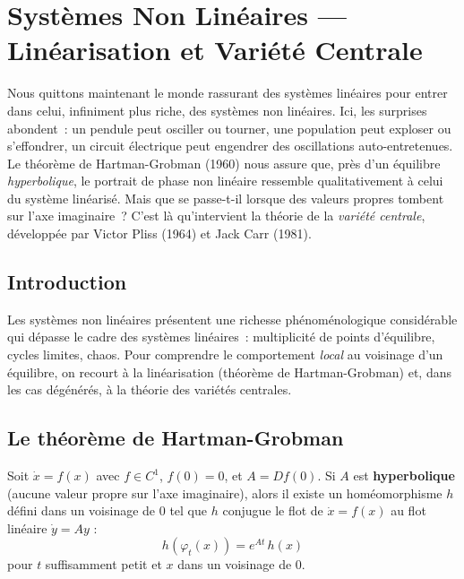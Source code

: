 \chapter{Syst\`emes Non Lin\'eaires --- Lin\'earisation et Vari\'et\'e Centrale}
\label{ch:non_lineaires}

Nous quittons maintenant le monde rassurant des syst\`emes lin\'eaires pour entrer dans celui, infiniment plus riche, des syst\`emes non lin\'eaires. Ici, les surprises abondent~: un pendule peut osciller ou tourner, une population peut exploser ou s'effondrer, un circuit \'electrique peut engendrer des oscillations auto-entretenues. Le th\'eor\`eme de Hartman-Grobman (1960) nous assure que, pr\`es d'un \'equilibre \emph{hyperbolique}, le portrait de phase non lin\'eaire ressemble qualitativement \`a celui du syst\`eme lin\'earis\'e. Mais que se passe-t-il lorsque des valeurs propres tombent sur l'axe imaginaire~? C'est l\`a qu'intervient la th\'eorie de la \emph{vari\'et\'e centrale}, d\'evelopp\'ee par Victor Pliss (1964) et Jack Carr (1981).

\section{Introduction}

Les syst\`emes non lin\'eaires pr\'esentent une richesse ph\'enom\'enologique
consid\'erable qui d\'epasse le cadre des syst\`emes lin\'eaires~:
multiplicit\'e de points d'\'equilibre, cycles limites, chaos. Pour
comprendre le comportement \emph{local} au voisinage d'un \'equilibre, on
recourt \`a la lin\'earisation (th\'eor\`eme de Hartman-Grobman) et, dans les
cas d\'eg\'en\'er\'es, \`a la th\'eorie des vari\'et\'es centrales.

\section{Le th\'eor\`eme de Hartman-Grobman}

\begin{theoreme}
\label{thm:hartman-grobman}
Soit $\dot{x} = f(x)$ avec $f \in C^1$, $f(0) = 0$, et $A = Df(0)$.
Si $A$ est \textbf{hyperbolique} (aucune valeur propre sur l'axe imaginaire),
alors il existe un hom\'eomorphisme $h$ d\'efini dans un voisinage de $0$
tel que $h$ conjugue le flot de $\dot{x} = f(x)$ au flot lin\'eaire
$\dot{y} = Ay$ :
\[
    h(\varphi_t(x)) = e^{At}\, h(x)
\]
pour $t$ suffisamment petit et $x$ dans un voisinage de $0$.
\end{theoreme}

